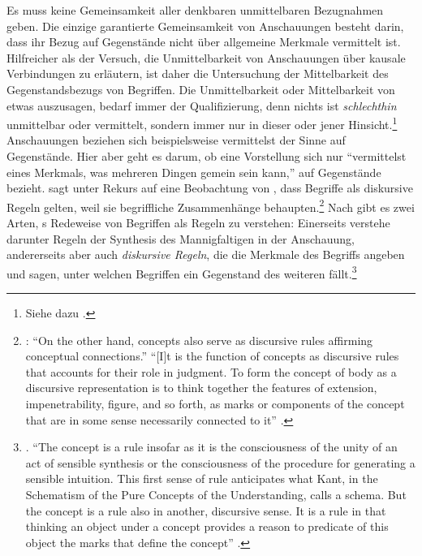 Es muss keine Gemeinsamkeit aller denkbaren unmittelbaren Bezugnahmen
geben. Die einzige garantierte Gemeinsamkeit von Anschauungen besteht darin,
dass ihr Bezug auf Gegenstände nicht über allgemeine Merkmale vermittelt ist. Hilfreicher als der Versuch, die
Unmittelbarkeit von Anschauungen über kausale Verbindungen zu erläutern, ist
daher die Untersuchung der Mittelbarkeit des Gegenstandsbezugs von Begriffen. Die Unmittelbarkeit oder Mittelbarkeit von etwas auszusagen,
bedarf immer der Qualifizierung, denn nichts ist \emph{schlechthin} unmittelbar
oder vermittelt, sondern immer nur in dieser oder jener Hinsicht.\footnote{Siehe
dazu \cite{Sellars:EmpiricismandthePhilosophyofMind1997}.} Anschauungen beziehen sich
beispielsweise vermittelst der Sinne auf Gegenstände. Hier aber geht es darum,
ob eine Vorstellung sich nur \enquote{vermittelst eines Merkmals, was mehreren
Dingen gemein sein kann,} auf Gegenstände bezieht.
 sagt unter Rekurs auf
eine Beobachtung von , dass Begriffe als diskursive
Regeln gelten, weil sie begriffliche Zusammenhänge
behaupten.\footnote{\cite[Vgl.][79]{Allison:KantsTranscendentalIdealism2004}:
\enquote{On the other hand, concepts also serve as discursive rules affirming
conceptual connections.} \enquote{[I]t is the function of concepts as discursive rules
that accounts for their role in judgment. To form the concept of body as a
discursive representation is to think together the features of extension,
impenetrability, figure, and so forth, as marks or components of the concept
that are in some sense \punkt{} necessarily connected to it}
\parencite[][79]{Allison:KantsTranscendentalIdealism2004}.}
Nach  gibt
es zwei Arten, s Redeweise von Begriffen als
Regeln zu verstehen: Einerseits verstehe 
darunter Regeln der Synthesis des Mannigfaltigen in der Anschauung,
andererseits aber auch \emph{diskursive Regeln}, die die Merkmale des
Begriffs angeben und sagen, unter welchen Begriffen ein Gegenstand des weiteren
fällt.\footnote{\cite[Vgl.][48--50]{Longuenesse:KantandtheCapacitytoJudge1998}.
\enquote{The concept is a rule insofar as it is the consciousness of
  the unity of an act of sensible synthesis or the consciousness of
  the procedure for generating a sensible intuition. This first sense
  of rule anticipates what Kant, in the Schematism of the Pure
  Concepts of the Understanding, calls a schema. But the concept is a
  rule also in another, discursive sense. It is a rule in that
  thinking an object under a concept provides a reason to predicate of
  this object the marks that define the
  concept} \parencite[][50]{Longuenesse:KantandtheCapacitytoJudge1998}.}


